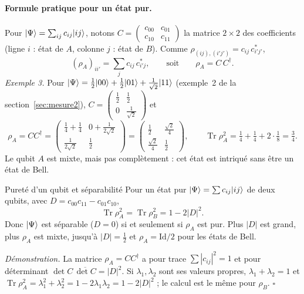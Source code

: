 \paragraph{Formule pratique pour un état pur.} Pour $|\Psi\rangle=\sum_{ij}c_{ij}|ij\rangle$, notons
$C=\begin{pmatrix}c_{00}&c_{01}\\c_{10}&c_{11}\end{pmatrix}$ la matrice $2\times2$ des coefficients
(ligne $i$ : état de $A$, colonne $j$ : état de $B$). Comme $\rho_{(ij),(i'j')}=c_{ij}\,c_{i'j'}^*$,
\[
  (\rho_A)_{ii'}=\sum_jc_{ij}\,c_{i'j}^*,\qquad\text{soit}\qquad \rho_A=C\,C^\dagger .
\]
\emph{Exemple 3.} Pour $|\Psi\rangle=\frac12|00\rangle+\frac12|01\rangle+\frac{1}{\sqrt2}|11\rangle$ (exemple~2
de la section~\ref{sec:mesure2}), $C=\begin{pmatrix}\frac12&\frac12\\0&\frac{1}{\sqrt2}\end{pmatrix}$ et
\[
  \rho_A=CC^\dagger=\begin{pmatrix}\frac14+\frac14&0+\frac{1}{2\sqrt2}\\[0.4ex]\frac{1}{2\sqrt2}&\frac12\end{pmatrix}
  =\begin{pmatrix}\frac12&\frac{\sqrt2}{4}\\[0.4ex]\frac{\sqrt2}{4}&\frac12\end{pmatrix},
  \qquad
  \operatorname{Tr}\rho_A^2=\tfrac14+\tfrac14+2\cdot\tfrac18=\tfrac34 .
\]
Le qubit $A$ est mixte, mais pas complètement : cet état est intriqué sans être un état de Bell.

\begin{resultat}{Pureté d'un qubit et séparabilité}
Pour un état pur $|\Psi\rangle=\sum c_{ij}|ij\rangle$ de deux qubits, avec $D=c_{00}c_{11}-c_{01}c_{10}$,
\[
  \operatorname{Tr}\rho_A^2=\operatorname{Tr}\rho_B^2=1-2|D|^2 .
\]
Donc $|\Psi\rangle$ est séparable ($D=0$) si et seulement si $\rho_A$ est pur. Plus $|D|$ est grand,
plus $\rho_A$ est mixte, jusqu'à $|D|=\frac12$ et $\rho_A=\mathrm{Id}/2$ pour les états de Bell.
\end{resultat}

\emph{Démonstration.} La matrice $\rho_A=CC^\dagger$ a pour trace $\sum|c_{ij}|^2=1$ et pour
déterminant $\det C\,\overline{\det C}=|D|^2$. Si $\lambda_1,\lambda_2$ sont ses valeurs propres,
$\lambda_1+\lambda_2=1$ et $\operatorname{Tr}\rho_A^2=\lambda_1^2+\lambda_2^2=1-2\lambda_1\lambda_2
=1-2|D|^2$ ; le calcul est le même pour $\rho_B$. \hfill$\square$


